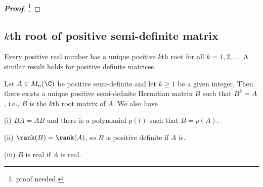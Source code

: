 \begin{proof}[\bf Proof]
\footnote{proof needed.}
\end{proof}





\subsection{$k$th root of positive semi-definite matrix}

Every positive real number has a unique positive $k$th root for all $k=1,2,\dots$. A similar result holds for positive definite matrices.

\begin{theorem}\label{thm:existence_uniqueness_kth_root_matrix_of_positive_semi-definite_matrix}
Let $A\in M_n(\C)$ be positive semi-definite and let $k\geq 1$ be a given integer. Then there exists a unique positive semi-definite Hermitian matrix $B$ such that $B^k = A$, i.e., $B$ is the $k$th
root matrix of $A$. We also have
\ben
\item [(i)] $BA = AB$ and there is a polynomial $p(t)$ such that $B = p(A)$.
\item [(ii)] $\rank(B) = \rank(A)$, so $B$ is positive definite if $A$ is.
\item [(iii)] $B$ is real if $A$ is real.
\een
\end{theorem}

